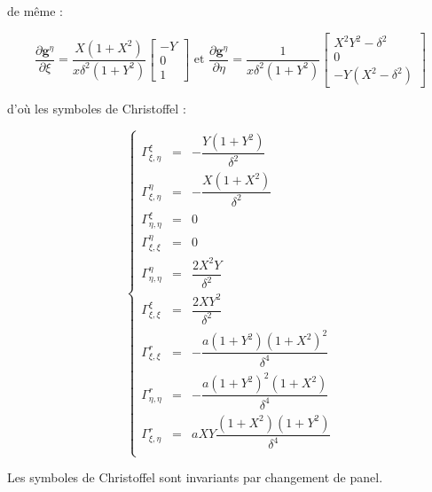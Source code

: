 de même :

\begin{equation}
\dfrac{\partial \mathbf{g}^{\eta}}{\partial \xi} = \dfrac{X(1+X^2)}{x \delta^2 (1+Y^2)} \begin{bmatrix}
-Y \\ 0 \\ 1
\end{bmatrix}
\text{ et }
\dfrac{\partial \mathbf{g}^{\eta}}{\partial \eta} = \dfrac{1}{x \delta^2 (1+Y^2)} \begin{bmatrix}
X^2 Y^2 - \delta^2 \\ 0 \\ -Y(X^2 - \delta^2)
\end{bmatrix}
\end{equation}

d'où les symboles de Christoffel :

\begin{equation}
\left\lbrace
\begin{array}{rcl}
\Gamma_{\xi,\eta}^{\xi} & = & - \dfrac{Y ( 1+Y^2)}{\delta^2}\\
\Gamma_{\xi,\eta}^{\eta} & = & - \dfrac{X(1+X^2)}{\delta^2}\\
\Gamma_{\eta,\eta}^{\xi} & = & 0 \\
\Gamma_{\xi,\xi}^{\eta} & = & 0 \\
\Gamma_{\eta,\eta}^{\eta} & = & \dfrac{2 X^2 Y}{\delta^2}\\
\Gamma_{\xi,\xi}^{\xi} & = & \dfrac{2 X Y^2}{\delta^2}\\
\Gamma_{\xi,\xi}^{r} & = & - \dfrac{a (1+Y^2)(1+X^2)^2}{\delta^4}\\
\Gamma_{\eta,\eta}^{r} & = & - \dfrac{a (1+Y^2)^2(1+X^2)}{\delta^4} \\
\Gamma_{\xi,\eta}^r & = & a XY \dfrac{(1+X^2)(1+Y^2)}{\delta^4}\\
\end{array}
\right.
\end{equation}

\begin{proposition}
Les symboles de Christoffel sont invariants par changement de panel.
\end{proposition}

